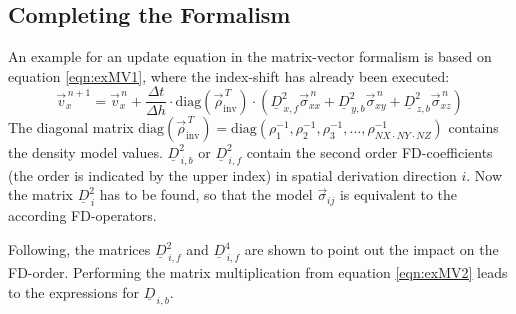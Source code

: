 \documentclass[pdftex,a4paper,parskip,listof=totoc,bibliography=totoc,onehalfspacing,12pt]{scrreprt}
\begin{document}
\subsection{Completing the Formalism}\label{sec:Mat}
An example for an update equation in the matrix-vector formalism is based on equation \ref{eqn:exMV1}, where the index-shift has already been executed:
\begin{equation}
	\vec{v}_x^{\,n+1} = \vec{v}_x^{\,n} + \frac{\Delta t}{\Delta h} \cdot \mathrm{diag} \left( \vec{\rho}_\mathrm{inv}^{\,T} \right) \cdot \left( \underline{D}_{\,x,f}^2 \vec{\sigma}_{xx}^{\,n} + \underline{D}_{\,y,b}^2 \vec{\sigma}_{xy}^{\,n} + \underline{D}_{\,z,b}^2 \vec{\sigma}_{xz}^{\,n} \right)\label{eqn:exMV2}
\end{equation}
The diagonal matrix $\mathrm{diag} \left( \vec{\rho}_\mathrm{inv}^{\,T} \right) = \mathrm{diag} \left( \rho_1^{-1}, \rho_2^{-1}, \rho_3^{-1}, \dots , \rho_{NX \cdot NY \cdot NZ}^{-1} \right)$ contains the density model values. $\underline{D}_{\,i,b}^2$ or $\underline{D}_{\,i,f}^2$ contain the second order FD-coefficients (the order is indicated by the upper index) in spatial derivation direction $i$. Now the matrix $\underline{D}_{\,i}^2$ has to be found, so that the model $\vec{\sigma}_{ij}$ is equivalent to the according FD-operators.

Following, the matrices $\underline{D}_{\,i,f}^2$ and $\underline{D}_{\,i,f}^4$ are shown to point out the impact on the FD-order. Performing the matrix multiplication from equation \ref{eqn:exMV2} leads to the expressions for $\underline{D}_{\,i,b}$.
\end{document}
